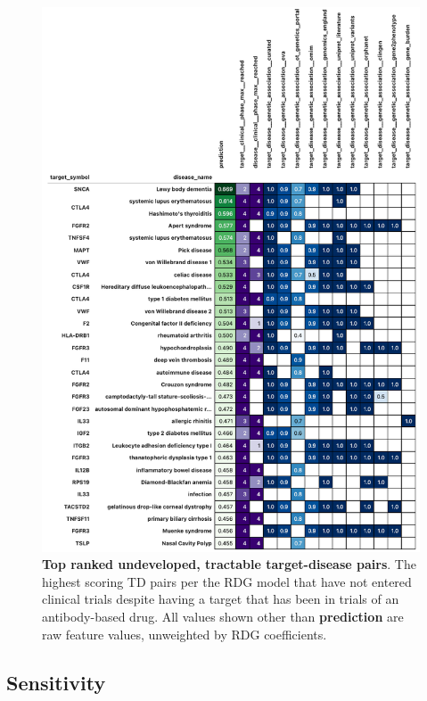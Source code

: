 \documentclass{article}
\begin{document}
\pagebreak



\clearpage

\begin{figure}[H]
  \centering
  \captionsetup{width=.9\linewidth}
  \includegraphics[width=.9\textwidth]{top_opportunity_predictions.png}
  \caption{
    \textbf{Top ranked undeveloped, tractable target-disease pairs}. The highest scoring TD pairs per the RDG model that have not entered clinical trials despite having a target that has been in trials of an antibody-based drug. All values shown other than \textbf{prediction} are raw feature values, unweighted by RDG coefficients.
  }
  \label{fig:top_opportunity_predictions}
\end{figure}

\pagebreak

\subsection{Sensitivity}
\label{sec:sensitivity}
\end{document}
